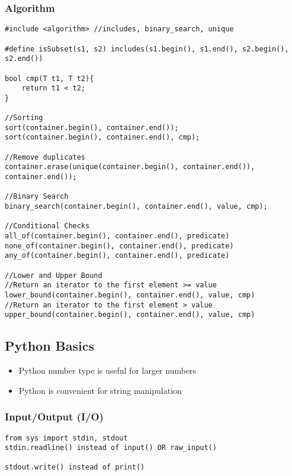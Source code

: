 \subsubsection{Algorithm}
\begin{lstlisting}[style=CStyle]
#include <algorithm> //includes, binary_search, unique

#define isSubset(s1, s2) includes(s1.begin(), s1.end(), s2.begin(), s2.end())

bool cmp(T t1, T t2){
	return t1 < t2;
}

//Sorting
sort(container.begin(), container.end());
sort(container.begin(), container.end(), cmp);

//Remove duplicates
container.erase(unique(container.begin(), container.end()), container.end());

//Binary Search
binary_search(container.begin(), container.end(), value, cmp);

//Conditional Checks
all_of(container.begin(), container.end(), predicate)
none_of(container.begin(), container.end(), predicate)
any_of(container.begin(), container.end(), predicate)

//Lower and Upper Bound
//Return an iterator to the first element >= value
lower_bound(container.begin(), container.end(), value, cmp)
//Return an iterator to the first element > value
upper_bound(container.begin(), container.end(), value, cmp)
\end{lstlisting}


\clearpage


\subsection{Python Basics}
\begin{itemize}
\item Python number type is useful for larger numbers
\item Python is convenient for string manipulation
\end{itemize}


\subsubsection{Input/Output (I/O)}
\begin{lstlisting}[style=PyStyle]
from sys import stdin, stdout
stdin.readline() instead of input() OR raw_input()

stdout.write() instead of print()
\end{lstlisting}

